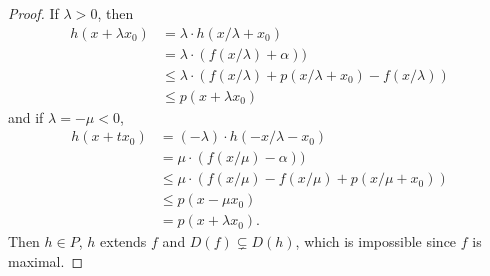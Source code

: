 \documentclass{article}
\theoremstyle{definition}
\begin{document}
\begin{proof}
If $\lambda >0$, then 
\begin{align*}
	h(x+\lambda x_0)&=\lambda\cdot h(x/\lambda+x_0)\\
	&=\lambda\cdot(f(x/\lambda)+\alpha))\\
	&\leq \lambda\cdot(f(x/\lambda)+p(x/\lambda+x_0)-f(x/\lambda))\\
	&\leq p(x+\lambda x_0)
\end{align*}
and if $\lambda=-\mu<0$,
\begin{align*}
	h(x+tx_0)&=(-\lambda)\cdot h(-x/\lambda-x_0)\\
	&=\mu\cdot(f(x/\mu)-\alpha))\\
	&\leq \mu\cdot(f(x/\mu)-f(x/\mu)+p(x/\mu+x_0))\\
	&\leq p(x-\mu x_0)\\
	&=p(x+\lambda x_0).
\end{align*}
Then $h\in P$, $h$ extends $f$ and $D(f)\subsetneq D(h)$, which is impossible since $f$ is maximal.
\end{proof}
\clearpage
\end{document}

